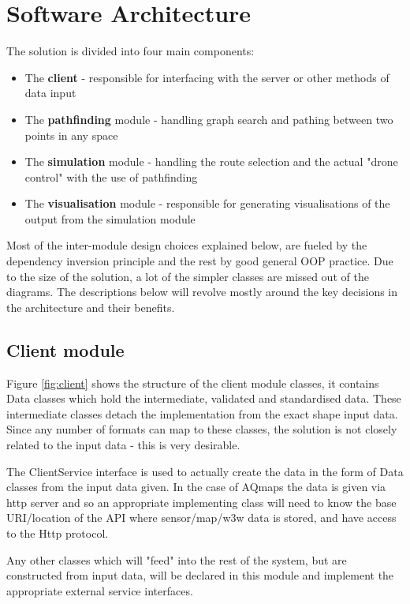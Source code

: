 \documentclass[10pt,a4paper]{article}
\begin{document}
\tableofcontents
\newpage
{}


\section{Software Architecture}
The solution is divided into four main components: 
\begin{itemize}
    \item The \textbf{client} - responsible for interfacing with the server or other methods of data input
    \item The \textbf{pathfinding} module - handling graph search and pathing between two points in any space
    \item The \textbf{simulation} module - handling the route selection and the actual "drone control" with the use of pathfinding
    \item The \textbf{visualisation} module - responsible for generating visualisations of the output from the simulation module
\end{itemize}

Most of the inter-module design choices explained below, are fueled by the dependency inversion principle and the rest by good general OOP practice. 
Due to the size of the solution, a lot of the simpler classes are missed out of the diagrams. 
The descriptions below will revolve mostly around the key decisions in the architecture and their benefits.

\subsection{Client module}
Figure \ref{fig:client} shows the structure of the client module classes, it contains Data classes which hold the intermediate, validated and standardised data.
These intermediate classes detach the implementation from the exact shape input data. 
Since any number of formats can map to these classes, the solution is not closely related to the input data - this is very desirable. \par

The ClientService interface is used to actually create the data in the form of Data classes from the input data given. 
In the case of AQmaps the data is given via http server and so an appropriate implementing class will need to know the base URI/location of the API where sensor/map/w3w data is stored, and have access to the Http protocol.

\par 
Any other classes which will "feed" into the rest of the system, but are constructed from input data, will be declared in this module and implement the appropriate external service interfaces.
\end{document}
